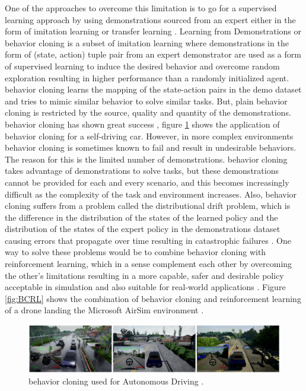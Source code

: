 One of the approaches to overcome this limitation is to go for a supervised learning approach by using demonstrations sourced from an expert \cite{ARGALL2009469} \cite{RLFD} either in the form of imitation learning \cite{reddy2019sqil}  \cite{ILRL} or transfer learning \cite{Taylor2009TransferLF} \cite{TLMARLS} \cite{zhu2021transfer} \cite{ILTLRL}. Learning from Demonstrations or behavior cloning is a subset of imitation learning where demonstrations in the form of (state, action) tuple pair from an expert demonstrator are used as a form of supervised learning to induce the desired behavior and overcome random exploration resulting in higher performance than a randomly initialized agent. behavior cloning learns the mapping of the state-action pairs in the demo dataset and tries to mimic similar behavior to solve similar tasks. But, plain behavior cloning is restricted by the source, quality and quantity of the demonstrations. behavior cloning has shown great success \cite{BCAD} \cite{sumanth2020enhanced}, figure \ref{fig:BCAD} shows the application of behavior cloning for a self-driving car. However, in more complex environments behavior cloning is sometimes known to fail and result in undesirable behaviors. The reason for this is the limited number of demonstrations. behavior cloning takes advantage of demonstrations to solve tasks, but these demonstrations cannot be provided for each and every scenario, and this becomes increasingly difficult as the complexity of the task and environment increases. Also, behavior cloning suffers from a problem called the distributional drift problem, which is the difference in the distribution of the states of the learned policy and the distribution of the states of the expert policy in the demonstrations dataset causing errors that propagate over time resulting in catastrophic failures \cite{goecks2020integrating} \cite{codevilla2019exploring}. One way to solve these problems would be to combine behavior cloning with reinforcement learning, which in a sense complement each other by overcoming the other's limitations resulting in a more capable, safer and desirable policy acceptable in simulation and also suitable for real-world applications \cite{gao2019reinforcement} \cite{nair2018overcoming} \cite{vecerik2018leveraging}. Figure \ref{fig:BCRL} shows the combination of behavior cloning and reinforcement learning of a drone landing the Microsoft AirSim environment \cite{shah2017airsim}. \\

\begin{figure}[h!]
    \centering
    \includegraphics[width=\textwidth]{images/BCAD.png}
    \caption{behavior cloning used for Autonomous Driving \cite{codevilla2019exploring}.}
    \label{fig:BCAD}
\end{figure}

